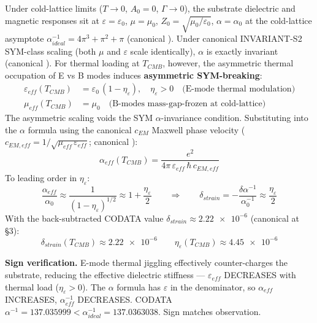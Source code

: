 Under cold-lattice limits ($T \to 0$, $A_0 = 0$, $\Gamma \to 0$), the substrate dielectric and magnetic responses sit at $\varepsilon = \varepsilon_0$, $\mu = \mu_0$, $Z_0 = \sqrt{\mu_0/\varepsilon_0}$, $\alpha = \alpha_0$ at the cold-lattice asymptote $\alpha^{-1}_{ideal} = 4\pi^3 + \pi^2 + \pi$ (canonical ). Under canonical INVARIANT-S2 SYM-class scaling (both $\mu$ and $\varepsilon$ scale identically), $\alpha$ is exactly invariant (canonical ). For thermal loading at $T_{CMB}$, however, the asymmetric thermal occupation of E vs B modes induces \textbf{asymmetric SYM-breaking}:
\begin{align}
\varepsilon_{eff}(T_{CMB}) &= \varepsilon_0\,(1 - \eta_\varepsilon), \quad \eta_\varepsilon > 0 \quad \text{(E-mode thermal modulation)} \\
\mu_{eff}(T_{CMB}) &= \mu_0 \quad \text{(B-modes mass-gap-frozen at cold-lattice)}
\end{align}
The asymmetric scaling voids the SYM $\alpha$-invariance condition. Substituting into the $\alpha$ formula using the canonical $c_{EM}$ Maxwell phase velocity ($c_{EM,eff} = 1/\sqrt{\mu_{eff}\,\varepsilon_{eff}}$; canonical ):
\begin{equation}
\alpha_{eff}(T_{CMB}) = \frac{e^2}{4\pi\,\varepsilon_{eff}\,\hbar\,c_{EM,eff}}
\end{equation}
To leading order in $\eta_\varepsilon$:
\begin{equation}
\frac{\alpha_{eff}}{\alpha_0} \approx \frac{1}{(1-\eta_\varepsilon)^{1/2}} \approx 1 + \frac{\eta_\varepsilon}{2} \qquad\Rightarrow\qquad \delta_{strain} = -\frac{\delta\alpha^{-1}}{\alpha^{-1}_0} \approx \frac{\eta_\varepsilon}{2}
\end{equation}
With the back-subtracted CODATA value $\delta_{strain} \approx \num{2.22e-6}$ (canonical at  \S 3):
\begin{equation}
\boxed{\;\delta_{strain}(T_{CMB}) \approx \num{2.22e-6} \qquad \eta_\varepsilon(T_{CMB}) \approx \num{4.45e-6}\;}
\end{equation}

\textbf{Sign verification.} E-mode thermal jiggling effectively counter-charges the substrate, reducing the effective dielectric stiffness --- $\varepsilon_{eff}$ DECREASES with thermal load ($\eta_\varepsilon > 0$). The $\alpha$ formula has $\varepsilon$ in the denominator, so $\alpha_{eff}$ INCREASES, $\alpha^{-1}_{eff}$ DECREASES. CODATA $\alpha^{-1} = 137.035999 < \alpha^{-1}_{ideal} = 137.0363038$. Sign matches observation.

